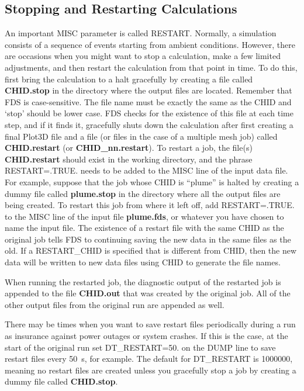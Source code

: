 \documentclass[11pt]{book}
\begin{document}
\subsection{Stopping and Restarting Calculations}
\label{info:restart}

An important {\ct MISC} parameter is called {\ct RESTART}. Normally, a simulation consists of a sequence of events
starting from ambient conditions. However, there are occasions
when you might want to stop a calculation, make a few
limited adjustments, and then
restart the calculation from that point in time. To do this,
first bring the calculation to a halt gracefully by creating a file
called {\bf CHID.stop}
in the directory where the output files are located. Remember that
FDS is case-sensitive. The file name must be exactly the same as
the {\ct CHID} and `stop' should be lower case. FDS checks for the
existence of this file at each time step, and if it finds it, gracefully
shuts down the calculation after first creating a final Plot3D
file and a file (or files in the case of a multiple mesh job)
called {\bf CHID.restart} (or {\bf CHID\_nn.restart}).
To restart a job, the file(s) {\bf CHID.restart} should exist in
the working directory, and
the phrase {\ct RESTART=.TRUE.} needs to be added
to the {\ct MISC} line of the input data file.
For example, suppose that the job
whose {\ct CHID} is ``plume'' is halted by creating a
dummy file called {\bf plume.stop} in the directory where
all the output files are being created. To restart this job from where it
left off, add {\ct RESTART=.TRUE.} to the {\ct MISC} line
of the input file {\bf plume.fds}, or whatever you have chosen to
name the input file. The existence of a restart file with the same
{\ct CHID} as the original job tells FDS
to continuing saving the new data in the same files as the old.  If a {\ct RESTART\_CHID} is specified that
is different from {\ct CHID}, then the new data will be written to new data files using {\ct CHID} to generate
the file names.

When running the restarted job, the diagnostic
output of the restarted job is appended to the file {\bf CHID.out} that was created by
the original job.
All of the other output files from the original run are appended as well.

There may be times when you want to save restart files periodically
during a run as insurance against power outages or system crashes.
If this is the case, at the start of the original run
set {\ct DT\_RESTART=50.} on the {\ct DUMP} line to save restart files
every 50~s, for example.
The default for {\ct DT\_RESTART} is 1000000, meaning no restart files are
created unless you gracefully stop a job by
creating a dummy file called {\bf CHID.stop}.
\end{document}
